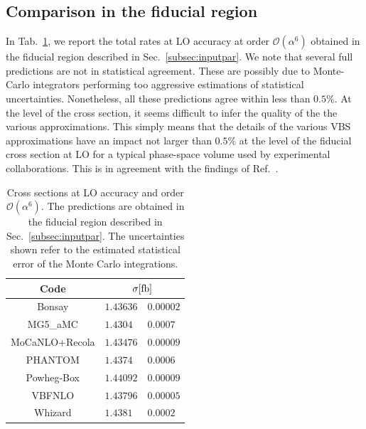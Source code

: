 \documentclass[twocolumn,epjc3]{svjour3} %
\begin{document}
    \subsection{Comparison in the fiducial region}
    In Tab.~\ref{tab:wg1_LOrates}, we report the total rates at LO accuracy at order $\mathcal O (\alpha^6)$ obtained in the fiducial region 
    described in Sec.~\ref{subsec:inputpar}. We note that several full predictions are not in statistical agreement. These are possibly due to Monte-Carlo 
    integrators performing too aggressive estimations of statistical uncertainties. Nonetheless, all these predictions agree within less than $0.5\%$.
    At the level of the cross section, it seems difficult to infer the quality of the the various approximations.
    This simply means that the details of the various VBS approximations have an impact not larger than $0.5\%$ at 
    the level of the fiducial cross section at LO for a typical phase-space volume used by experimental collaborations.
    This is in agreement with the findings of Ref.~\cite{Denner:2012dz,Oleari:2003tc}.

    \begin{table}[h!]
        \centering
        \begin{tabular}{c|r@{ $\pm$ }l}
          Code  &  \multicolumn{2}{c}{$\sigma[\rm{fb}]$}  \\
            \hline
            \hline
            {\sc Bonsay}  &  $1.43636$ & $0.00002$ \\
            {\sc MG5\_aMC}&  $1.4304\phantom{0}$ & $0.0007$ \\
            {\sc MoCaNLO+Recola}  &  $1.43476$ & $0.00009$ \\
            {\sc PHANTOM} &  $1.4374\phantom{0}$ & $0.0006 $  \\
            {\sc Powheg-Box}  &  $1.44092$ & $0.00009$ \\
            {\sc VBFNLO}  &  $1.43796$ & $0.00005$ \\
            {\sc Whizard} &  $1.4381\phantom{0}$ & $0.0002 $
        \end{tabular}
        \caption{\label{tab:wg1_LOrates} Cross sections at LO accuracy and order $\mathcal{O}(\alpha^6)$.
        The predictions are obtained in the fiducial region described in Sec.~\protect\ref{subsec:inputpar}.
        The uncertainties shown refer to the estimated statistical error of the Monte Carlo integrations.}
    \end{table}
\end{document}
